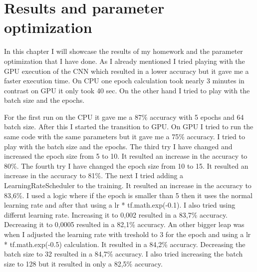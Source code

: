 \documentclass[11pt,a4paper,oneside]{report}
\begin{document}
\chapter{Results and parameter optimization}

In this chapter I will showcase the results of my homework and the parameter optimization that I have done.
As I already mentioned I tried playing with the GPU execution of the CNN which resulted in a lower accuracy but it gave me a faster execution time. On CPU one epoch calculation took nearly 3 minutes in contrast on GPU it only took 40 sec.
On the other hand I tried to play with the batch size and the epochs.

For the first run on the CPU it gave me a 87\% accuracy with 5 epochs and 64 batch size. After this I started the transition to GPU.
On GPU I tried to run the same code with the same parameters but it gave me a 75\% accuracy. I tried to play with the batch size and the epochs.
The third try I have changed and increased the epoch size from 5 to 10. It resulted an increase in the accuracy to 80\%.
The fourth try I have changed the epoch size from 10 to 15. It resulted an increase in the accuracy to 81\%.
The next I tried adding a LearningRateScheduler to the training. It resulted an increase in the accuracy to 83,6\%. I used a logic where if the epoch is smaller than 5 then it uses the normal learning rate and after that using a lr * tf.math.exp(-0.1).
I also tried using differnt learning rate. Increasing it to 0,002 resulted in a 83,7\% accuracy. Decreasing it to 0,0005 resulted in a 82,1\% accuracy.
An other bigger leap was when I adjusted the learning rate with treshold to 3 for the epoch and using a lr * tf.math.exp(-0.5) calculation. It resulted in a 84,2\% accuracy.
Decreasing the batch size to 32 resulted in a 84,7\% accuracy. I also tried increasing the batch size to 128 but it resulted in only a 82,5\% accuracy.
\end{document}
